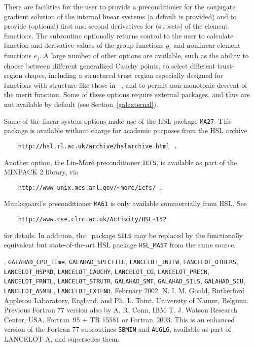 \documentclass{galahad}
\newcommand{\fullpackagename}{LANC\-E\-LOT}
\begin{document}
There are facilities for the user to provide a preconditioner for the
conjugate gradient solution of the internal linear systems (a default is
provided) and to provide (optional) first and second derivatives for (subsets)
of the element
functions.  The subroutine optionally returns control to the user to calculate
function and derivative values of the group functions $g_i$ and nonlinear
element functions $e_j$. A large number of other options are available,
such as
the ability to choose between different generalized Cauchy points, to select
different trust-region shapes, including a structured trust region especially
designed for functions with structure like those in
--, and to permit non-monotonic descent of
the merit function. Some of these options require external packages,
and thus are not available by default (see Section~\ref{galexternal}).

\galexternal

Some of the linear system options make use of the HSL package
{\tt MA27}. This package is available without charge for academic
purposes from the HSL archive
\begin{verbatim}
    http://hsl.rl.ac.uk/archive/hslarchive.html .
\end{verbatim}
Another option, the Lin-Mor\'{e} preconditioner {\tt ICFS}, is available as
part of the MINPACK 2 library, via
\begin{verbatim}
    http://www-unix.mcs.anl.gov/~more/icfs/ .
\end{verbatim}
Munksgaard's preconditioner {\tt MA61} is only available commercially
from HSL. See
\begin{verbatim}
    http://www.cse.clrc.ac.uk/Activity/HSL+152
\end{verbatim}
for details. In addition, the \galahad\ package {\tt SILS} may
be replaced by the functionally equivalent but state-of-the-art
HSL package {\tt HSL\_MA57} from the same source.


\galattributes
\galversions{\tt  \fullpackagename\_single, \fullpackagename\_double},
\galuses
{\tt GALAHAD\_CPU\_time},
{\tt GALAHAD\_SPECFILE},
{\tt LANCELOT\_INITW},
{\tt LANCELOT\_OTHERS},
{\tt LANCELOT\_HSPRD},
{\tt LANCELOT\_CAUCHY},
{\tt LANCELOT\_CG},
{\tt LANCELOT\_PRECN},
{\tt LANC\-ELOT\_FRNTL},
{\tt LANCELOT\_STRUTR},
{\tt GALAHAD\_SMT},
{\tt GAL\-AHAD\_SILS},
{\tt GALAHAD\_SCU},
{\tt LANCELOT\_ASMBL},
{\tt LANCELOT\_EXTEND}.
\galdate February 2002.
\galorigin N. I. M. Gould, Rutherford Appleton Laboratory, England, and
Ph. L. Toint, University of Namur, Belgium.
Previous Fortran 77 version also by A. R. Conn, IBM T. J.
Watson Research Center, USA.
\gallanguage Fortran~95 + TR 15581 or Fortran~2003.
\galremark This is an enhanced version of the Fortran 77 subroutines
{\tt SBMIN} and {\tt AUGLG},
available as part of {\sf LANCELOT A}, and supersedes them.
\end{document}
